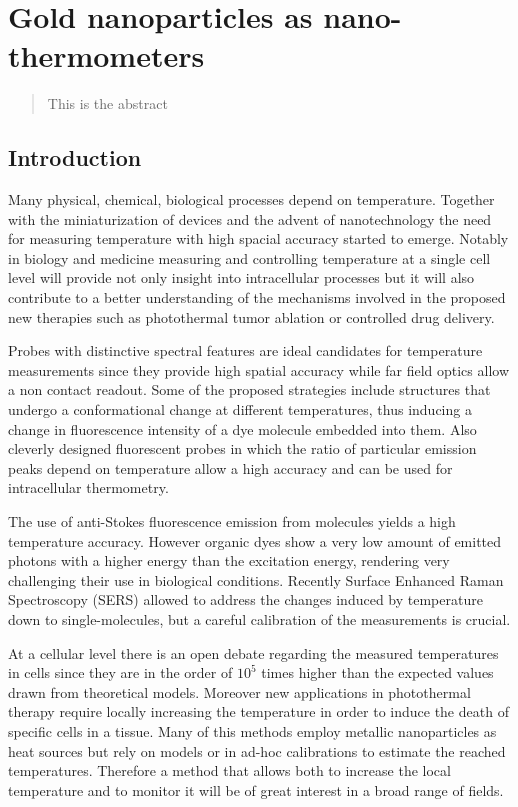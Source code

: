 \chapter{Gold nanoparticles as nano-thermometers}
\begin{abstract}
This is the abstract
\end{abstract}

\section{Introduction}
Many physical, chemical, biological processes depend on temperature. Together
with the miniaturization of devices and the advent of nanotechnology the need
for measuring temperature with high spacial accuracy started to emerge. Notably
in biology\cite{Yang2011a,Hrelescu2010} and medicine\cite{Li2013c}
measuring and controlling temperature at a single cell level will provide not only insight into
intracellular processes but it will also contribute to a better understanding of
the mechanisms involved in the proposed new therapies such as photothermal tumor
ablation\cite{Gobin2007} or controlled drug
delivery\cite{Huang2006}\cite{Huo2014}.

Probes with distinctive spectral features are ideal candidates for temperature
measurements since they provide high spatial accuracy while far field optics
allow a non contact readout. Some of the proposed strategies include structures
that undergo a conformational change at different
temperatures\cite{Ebrahimi2014}, thus inducing a change in fluorescence
intensity of a dye molecule embedded into them. Also cleverly designed
fluorescent probes\cite{Vetrone2010} in which the ratio of particular emission
peaks depend on temperature allow a high accuracy and can be used for
intracellular thermometry.

The use of anti-Stokes fluorescence emission from molecules yields a high
temperature accuracy\cite{Auzel2004a}. However organic dyes show a very low
amount of emitted photons with a higher energy than the excitation energy,
rendering very challenging their use in biological conditions. Recently Surface
Enhanced Raman Spectroscopy (SERS) allowed to address the changes induced by
temperature down to single-molecules\cite{Pozzi2015}, but a careful calibration
of the measurements is crucial.

At a cellular level there is an open debate regarding the measured temperatures
in cells since they are in the order of $10^5$ times higher than the expected
values drawn from theoretical models\cite{Yang2011a,Suzuki2015}. Moreover
new applications in photothermal therapy require locally increasing the
temperature in order to induce the death of specific cells in a
tissue\cite{Huang2008}\cite{Huang2006}. Many of this methods employ metallic
nanoparticles as heat sources\cite{Gobin2007}\cite{Hirsch2003} but rely on
models\cite{Zhao2014a} or in ad-hoc calibrations to estimate the reached
temperatures\cite{Donner2013}. Therefore a method that allows both to increase
the local temperature and to monitor it will be of great interest in a broad
range of fields.

